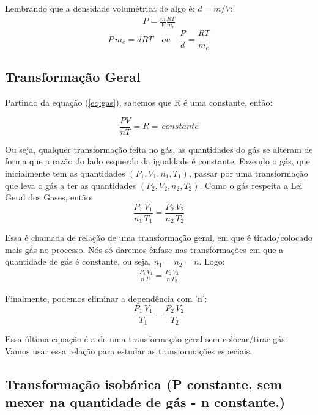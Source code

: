 \documentclass[12pt]{extarticle}
\newcommand{\<}{\langle}
\renewcommand{\>}{\rangle}
\theoremstyle{definition}
\begin{document}
Lembrando que a densidade volumétrica de algo é: $d = m/V$:
\begin{align*}
    P = \frac{m}{V}\frac{RT}{m_e}
\end{align*}
\begin{equation}
    P\,m_e = dRT \quad ou \quad \frac{P}{d} = \frac{RT}{m_e}
\end{equation}

\subsection{Transformação Geral}

Partindo da equação (\ref{eq:gas}), sabemos que R é uma constante, então:

\begin{equation}
    \frac{PV}{nT} = R =\, constante
\end{equation}

Ou seja, qualquer transformação feita no gás, as quantidades do gás se alteram de forma que a razão do lado esquerdo da igualdade é constante. Fazendo o gás, que inicialmente tem as quantidades $(P_1,V_1,n_1,T_1)$, passar por uma transformação que leva o gás a ter as quantidades $(P_2,V_2,n_2,T_2)$. Como o gás respeita a Lei Geral dos Gases, então:
\begin{equation}\label{eq:transform}
    \frac{P_1\,V_1}{n_1\,T_1} = \frac{P_2\,V_2}{n_2\,T_2}
\end{equation}

Essa é chamada de relação de uma transformação geral, em que é tirado/colocado mais gás no processo. Nós só daremos ênfase nas transformações em que a quantidade de gás é constante, ou seja, $n_1=n_2=n$. Logo:
\begin{align*}
    \frac{P_1\,V_1}{n\,T_1} = \frac{P_2\,V_2}{n\,T_2}
\end{align*}

Finalmente, podemos eliminar a dependência com 'n':
\begin{equation}\label{eq:transform_1}
    \frac{P_1\,V_1}{T_1} = \frac{P_2\,V_2}{T_2}
\end{equation}

Essa última equação é a de uma transformação geral sem colocar/tirar gás. Vamos usar essa relação para estudar as transformações especiais.

\subsection{Transformação isobárica (P constante, sem mexer na quantidade de gás - n constante.)}
\end{document}
